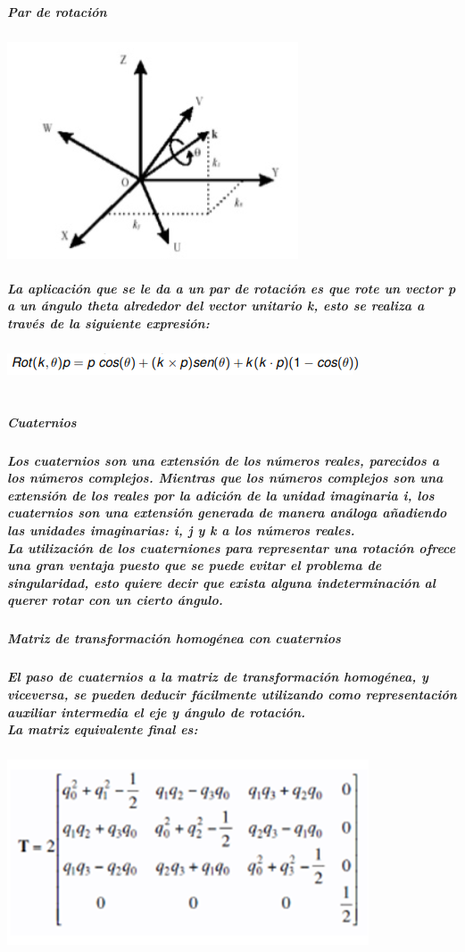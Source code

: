 \documentclass[12pt,a4paper]{report}
\begin{document}
\subparagraph{Par de rotación}
\begin{center}
\includegraphics[scale=1]{2.png}  
\end{center}
\subparagraph{La aplicación que se le da a un par de rotación es que rote un vector p a un ángulo theta alrededor del vector unitario k, esto se realiza a través de la siguiente expresión:\\}
\begin{flushleft}
\includegraphics[scale=1]{1.png}  
\end{flushleft}
\subparagraph{\\
Cuaternios}
\subparagraph{
Los cuaternios son una extensión de los números reales, parecidos a los números complejos. Mientras que los números complejos son una extensión de los reales por la adición de la unidad imaginaria i, los cuaternios son una extensión generada de manera análoga añadiendo las unidades imaginarias: i, j y k a los números reales.\\
La utilización de los cuaterniones para representar una rotación ofrece una gran ventaja puesto que se puede evitar el problema de singularidad, esto quiere decir que exista alguna indeterminación al querer rotar con un cierto ángulo.\\}

\subparagraph{Matriz de transformación homogénea con cuaternios}

\subparagraph{El paso de cuaternios a la matriz de transformación homogénea, y viceversa, se pueden deducir fácilmente utilizando como representación auxiliar intermedia el eje y ángulo de rotación.\\
La matriz equivalente final es:}

\begin{center}
\includegraphics[scale=1]{22.png} 
\end{center}




\end{document}
